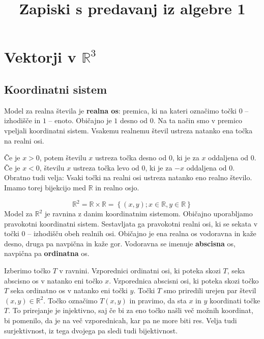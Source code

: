 \documentclass[12pt]{article}
\title{Zapiski s predavanj iz algebre 1}
\begin{document}
\maketitle

\section{Vektorji v \(\mathbb{R}^3\)}
\subsection{Koordinatni sistem}
    Model za realna števila je \textbf{realna os}: premica, ki na kateri označimo točki \(0\) -- izhodišče in \(1\) -- enoto.
    Običajno je \(1\) desno od \(0\). Na ta način smo v premico vpeljali koordinatni sistem. Vsakemu realnemu števil
    ustreza natanko ena točka na realni osi.

    Če je \(x > 0\), potem številu \(x\) ustreza točka desno od \(0\), ki je za \(x\) oddaljena od \(0\). Če je 
    \(x < 0\), številu \(x\) ustreza točka levo od \(0\), ki je za \(-x\) oddaljena od \(0\).
    Obratno tudi velja: Vsaki točki na realni osi ustreza natanko eno realno število.
    Imamo torej bijekcijo med \(\mathbb{R}\) in realno osjo.

    \[\mathbb{R}^2 = \mathbb{R} \times \mathbb{R} = \left\{\left(x, y\right); x \in \mathbb{R}, y \in \mathbb{R}\right\}\]
    Model za \(\mathbb{R}^2\) je ravnina z danim koordinatnim sistemom. Običajno uporabljamo pravokotni koordinatni sistem.
    Sestavljata ga pravokotni realni osi, ki se sekata v točki \(0\) -- izhodišču obeh realnih osi. Običajno je ena realna
    os vodoravna in kaže desno, druga pa navpična in kaže gor. Vodoravna se imenuje \textbf{abscisna} os, navpična pa
    \textbf{ordinatna} os.


    Izberimo točko \(T\) v ravnini. Vzporednici ordinatni osi, ki poteka skozi \(T\), seka abscisno os v natanko eni
    točko \(x\). Vzporednica abscisni osi, ki poteka skozi točko \(T\) seka ordinatno os v natanko eni točki \(y\).
    Točki \(T\) smo priredili urejen par števil \(\left(x, y\right) \in \mathbb{R}^2\). Točko označimo \(T\left(x, y\right)\)
    in pravimo, da sta \(x\) in \(y\) koordinati točke \(T\). To prirejanje je injektivno, saj če bi za eno točko našli
    več možnih koordinat, bi pomenilo, da je na več vzporednicah, kar pa ne more biti res. Velja tudi surjektivnost,
    iz tega dvojega pa sledi tudi bijektivnost.
\end{document}
